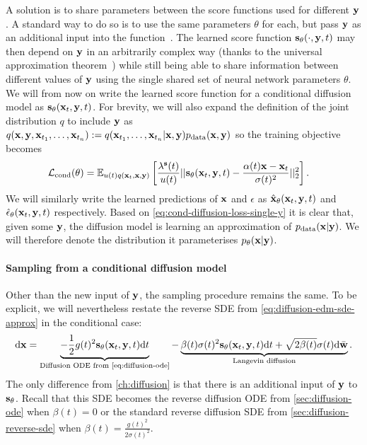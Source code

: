 A solution is to share parameters between the score functions used for different ${\mathbf{y}}$. A standard way to do so is to use the same parameters $\theta$ for each, but pass ${\mathbf{y}}$ as an additional input into the function~\citep{sohn2015learning}. The learned score function ${\mathbf{s}}_\theta(\cdot, {\mathbf{y}}, t)$ may then depend on ${\mathbf{y}}$ in an arbitrarily complex way (thanks to the universal approximation theorem~\citep{hornik1989multilayer}) while still being able to share information between different values of ${\mathbf{y}}$ using the single shared set of neural network parameters $\theta$. We will from now on write the learned score function for a conditional diffusion model as ${\mathbf{s}}_\theta({\mathbf{x}}_t, {\mathbf{y}}, t)$. For brevity, we will also expand the definition of the joint distribution $q$ to include ${\mathbf{y}}$ as $q({\mathbf{x}},{\mathbf{y}},{\mathbf{x}}_{t_1},\ldots,{\mathbf{x}}_{t_n}) := q({\mathbf{x}}_{t_1},\ldots,{\mathbf{x}}_{t_n}|{\mathbf{x}},{\mathbf{y}})p_{\rm{data}}({\mathbf{x}},{\mathbf{y}})$ so the training objective becomes
\begin{align} \label{eq:cond-diffusion-loss}
    {\mathcal{L}}_\text{cond}(\theta) &= \mathbb{E}_{u(t)q({\mathbf{x}}_t, {\mathbf{x}}, {\mathbf{y}})} \left[ \frac{\lambda^{\mathbf{s}}(t)}{u(t)} 
    || {\mathbf{s}}_{\theta}({\mathbf{x}}_t, {\mathbf{y}}, t) - \frac{\alpha(t){\mathbf{x}}-{\mathbf{x}}_t}{\sigma(t)^2} ||_2^2 \right].
\end{align}
We will similarly write the learned predictions of ${\mathbf{x}}$ and $\epsilon$ as $\hat{{\mathbf{x}}}_{\theta}({\mathbf{x}}_t, {\mathbf{y}}, t)$ and $\hat{\mathbf{\epsilon}}_{\theta}({\mathbf{x}}_t, {\mathbf{y}}, t)$ respectively.
Based on \cref{eq:cond-diffusion-loss-single-y} it is clear that, given some ${\mathbf{y}}$, the diffusion model is learning an approximation of $p_{\rm{data}}({\mathbf{x}}|{\mathbf{y}})$. We will therefore denote the distribution it parameterises $p_\theta({\mathbf{x}}|{\mathbf{y}})$.

\paragraph{Sampling from a conditional diffusion model}
Other than the new input of ${\mathbf{y}}$, the sampling procedure remains the same. To be explicit, we will nevertheless restate the reverse SDE from \cref{eq:diffusion-edm-sde-approx} in the conditional case:
\begin{align}
    \mathrm{d}\rvx = \underbrace{- \frac{1}{2} g(t)^2 \rvs_\theta(\rvx_t, \rvy, t) \mathrm{d}t}_\text{Diffusion ODE from \cref{eq:diffusion-ode}} - \underbrace{\beta(t) \sigma(t)^2 \rvs_\theta(\rvx_t, \rvy, t) \mathrm{d}t + \sqrt{2\beta(t)}\sigma(t)\mathrm{d}\bar{\rvw}}_\text{Langevin diffusion}.
\end{align}
The only difference from \cref{ch:diffusion} is that there is an additional input of ${\mathbf{y}}$ to ${\mathbf{s}}_\theta$. Recall that this SDE becomes the reverse diffusion ODE from \cref{sec:diffusion-ode} when $\beta(t) = 0$ or the standard reverse diffusion SDE from \cref{sec:diffusion-reverse-sde} when $\beta(t) = \frac{g(t)^2}{2 \sigma(t)^2}$.

